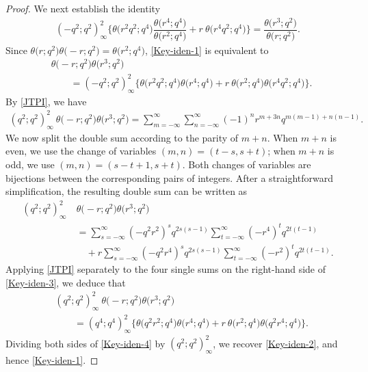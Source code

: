 \documentclass[12pt,reqno]{amsart}
\numberwithin{equation}{section}
\theoremstyle{plain}
\theoremstyle{definition}
\begin{document}
\begin{proof}
We next establish the identity
\begin{align}
(-q^2;q^2)_\infty^2\Bigg\{\theta\big(r^2q^2;q^4\big)\dfrac{\theta\big(r^4;q^4\big)}
{\theta\big(r^2;q^4\big)}+r\!\:\theta\big(r^4q^2;q^4\big)\Bigg\}
=\dfrac{\theta\big(r^3;q^2\big)}{\theta\big(r;q^2\big)}.\label{Key-iden-1}
\end{align}
Since $\theta\big(r;q^2\big)\theta\big({-}r;q^2\big)=\theta\big(r^2;q^4\big)$,
\eqref{Key-iden-1} is equivalent to
\begin{align}
 &\theta\big({-}r;q^2\big)\theta\big(r^3;q^2\big)\nonumber\\
 &\qquad=(-q^2;q^2)_\infty^2\big\{\theta\big(r^2q^2;q^4\big)\theta\big(r^4;q^4\big)
+r\!\:\theta\big(r^2;q^4\big)\theta\big(r^4q^2;q^4\big)\big\}.\label{Key-iden-2}
\end{align}
By \eqref{JTPI}, we have
\begin{align*}
(q^2;q^2)_\infty^2\!\:\theta\big({-}r;q^2\big)\theta\big(r^3;q^2\big)
=\sum_{m=-\infty}^\infty\sum_{n=-\infty}^\infty(-1)^nr^{m+3n}q^{m(m-1)+n(n-1)}.
\end{align*}
We now split the double sum according to the parity of $m+n$. When $m+n$ is even, we
use the change of variables $(m,n)=(t-s,s+t)$; when $m+n$ is odd, we use
$(m,n)=(s-t+1,s+t)$. Both changes of variables are bijections between the corresponding
pairs of integers. After a straightforward simplification, the resulting double sum can
be written as
\begin{align}
(q^2;q^2)_\infty^2\!\: &\theta\big({-}r;q^2\big)\theta\big(r^3;q^2\big)\nonumber\\
 &=\sum_{s=-\infty}^\infty(-q^2r^2)^{s}q^{2s(s-1)}\sum_{t=-\infty}^\infty(-r^4)^{t}
q^{2t(t-1)}\nonumber\\
 &\quad+r\sum_{s=-\infty}^\infty(-q^2r^4)^{s}q^{2s(s-1)}\sum_{t=-\infty}^\infty
(-r^2)^{t}q^{2t(t-1)}.\label{Key-iden-3}
\end{align}
Applying \eqref{JTPI} separately to the four single sums on the right-hand side of
\eqref{Key-iden-3}, we deduce that
\begin{align}
 &(q^2;q^2)_\infty^2\!\:\theta\big({-}r;q^2\big)\theta\big(r^3;q^2\big)\nonumber\\
 &\qquad=(q^4;q^4)_\infty^2\big\{\theta\big(q^2r^2;q^4\big)\theta\big(r^4;q^4\big)
+r\!\:\theta\big(r^2;q^4\big)\theta\big(q^2r^4;q^4\big)\big\}.\label{Key-iden-4}
\end{align}
Dividing both sides of \eqref{Key-iden-4} by $(q^2;q^2)_\infty^2$, we recover
\eqref{Key-iden-2}, and hence \eqref{Key-iden-1}.


\end{proof}
\end{document}
